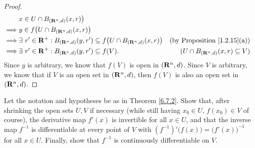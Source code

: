\begin{proof}
\begin{align*}
                 & x \in U \cap B_{(\mathbf{R}^n, d)}(x, r)\big)                                                                                                  \\
        \implies & y \in f\big(U \cap B_{(\mathbf{R}^n, d)}(x, r)\big)                                                                                            \\
        \implies & \exists\ r' \in \mathbf{R}^+ : B_{(\mathbf{R}^n, d)}(y, r') \subseteq f\big(U \cap B_{(\mathbf{R}^n, d)}(x, r)\big) & \text{(by Proposition \ref{1.2.15}(a))}  \\
        \implies & \exists\ r' \in \mathbf{R}^+ : B_{(\mathbf{R}^n, d)}(y, r') \subseteq f(V).                                 & (U \cap B_{(\mathbf{R}^n, d)}(x, r) \subseteq V)
    \end{align*}
    Since \(y\) is arbitrary, we know that \(f(V)\) is open in \((\mathbf{R}^n, d)\).
    Since \(V\) is arbitrary, we know that if \(V\) is an open set in \((\mathbf{R}^n, d)\), then \(f(V)\) is also an open set in \((\mathbf{R}^n, d)\).
\end{proof}

\begin{exercise}\label{ex 6.7.4}
    Let the notation and hypotheses be as in Theorem \ref{6.7.2}.
    Show that, after shrinking the open sets \(U, V\) if necessary (while still having \(x_0 \in U\), \(f(x_0) \in V\) of course), the derivative map \(f'(x)\) is invertible for all \(x \in U\), and that the inverse map \(f^{-1}\) is differentiable at every point of \(V\) with \((f^{-1})' \big(f(x)\big) = \big(f'(x)\big)^{-1}\) for all \(x \in U\).
    Finally, show that \(f^{-1}\) is continuously differentiable on \(V\).
\end{exercise}